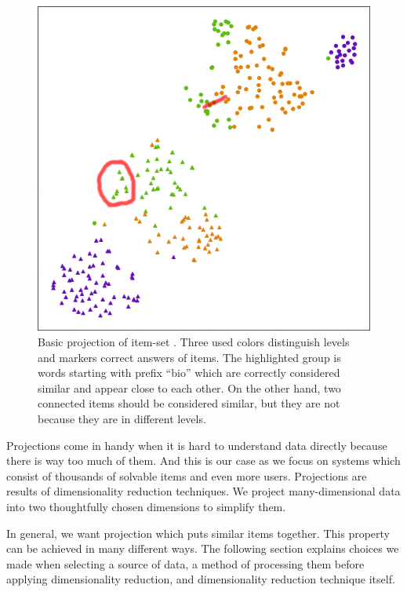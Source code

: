 \documentclass[
  digital, %
  table,   %
  nolof,     %
  nolot,     %
  nocover,
  color,
  final, %
]{fithesis3}
\begin{document}
\begin{figure}
    \includegraphics[width=\textwidth]{img/common_projection}
  \caption{Basic projection of item-set \cvicenieB{}. Three used colors distinguish levels and markers correct answers of items. The highlighted group is words starting with prefix ``bio'' which are correctly considered similar and appear close to each other. On the other hand, two connected items should be considered similar, but they are not because they are in different levels.}
  \label{fig:common_projection}
\end{figure}


Projections come in handy when it is hard to understand data directly because there is way too much of them. And this is our case as we focus on systems which consist of thousands of solvable items and even more users. Projections are results of dimensionality reduction techniques. We project many-dimensional data into two thoughtfully chosen dimensions to simplify them.


In general, we want projection which puts similar items together. This property can be achieved in many different ways. The following section explains choices we made when selecting a source of data, a method of processing them before applying dimensionality reduction, and dimensionality reduction technique itself.
\end{document}
